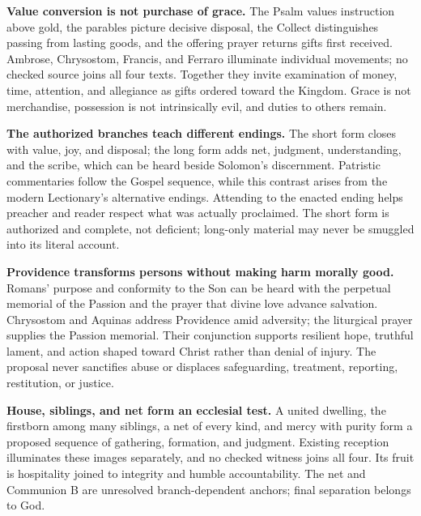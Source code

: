 \noindent\textbf{Value conversion is not purchase of grace.\enspace{}}
The Psalm values instruction above gold, the parables picture decisive disposal, the Collect distinguishes passing from lasting goods, and the offering prayer returns gifts first received. Ambrose, Chrysostom, Francis, and Ferraro illuminate individual movements; no checked source joins all four texts. Together they invite examination of money, time, attention, and allegiance as gifts ordered toward the Kingdom. Grace is not merchandise, possession is not intrinsically evil, and duties to others remain.

\noindent\textbf{The authorized branches teach different endings.\enspace{}}
The short form closes with value, joy, and disposal; the long form adds net, judgment, understanding, and the scribe, which can be heard beside Solomon's discernment. Patristic commentaries follow the Gospel sequence, while this contrast arises from the modern Lectionary's alternative endings. Attending to the enacted ending helps preacher and reader respect what was actually proclaimed. The short form is authorized and complete, not deficient; long-only material may never be smuggled into its literal account.

\noindent\textbf{Providence transforms persons without making harm morally good.\enspace{}}
Romans' purpose and conformity to the Son can be heard with the perpetual memorial of the Passion and the prayer that divine love advance salvation. Chrysostom and Aquinas address Providence amid adversity; the liturgical prayer supplies the Passion memorial. Their conjunction supports resilient hope, truthful lament, and action shaped toward Christ rather than denial of injury. The proposal never sanctifies abuse or displaces safeguarding, treatment, reporting, restitution, or justice.

\noindent\textbf{House, siblings, and net form an ecclesial test.\enspace{}}
A united dwelling, the firstborn among many siblings, a net of every kind, and mercy with purity form a proposed sequence of gathering, formation, and judgment. Existing reception illuminates these images separately, and no checked witness joins all four. Its fruit is hospitality joined to integrity and humble accountability. The net and Communion B are unresolved branch-dependent anchors; final separation belongs to God.

